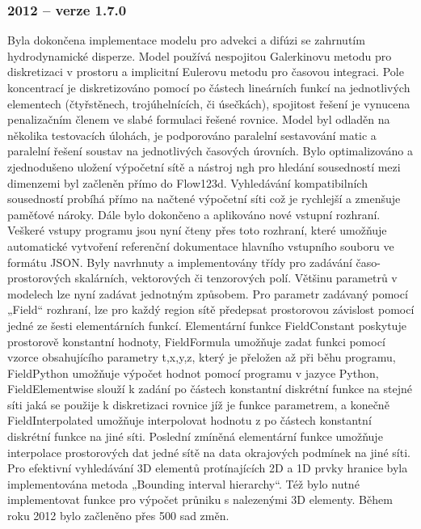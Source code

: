 \documentclass[11pt]{report}
\begin{document}
\subsubsection{2012 -- verze 1.7.0}
Byla dokončena implementace modelu pro advekci a difúzi se zahrnutím 
hydrodynamické disperze. Model používá nespojitou Galerkinovu metodu pro 
diskretizaci v prostoru a implicitní Eulerovu metodu pro časovou integraci.  
Pole koncentrací je diskretizováno pomocí po částech lineárních funkcí na 
jednotlivých elementech (čtyřstěnech, trojúhelnících, či úsečkách), spojitost 
řešení je vynucena penalizačním členem ve slabé formulaci řešené rovnice. Model 
byl odladěn na několika testovacích úlohách, je podporováno paralelní 
sestavování matic a paralelní řešení soustav na jednotlivých časových 
úrovních.
Bylo optimalizováno a zjednodušeno uložení výpočetní sítě a nástroj ngh pro 
hledání sousedností mezi dimenzemi byl začleněn přímo do Flow123d. Vyhledávání 
kompatibilních sousedností probíhá přímo na načtené výpočetní síti což je 
rychlejší a zmenšuje paměťové nároky. 
Dále bylo dokončeno a aplikováno nové vstupní rozhraní. Veškeré vstupy programu 
jsou nyní čteny přes toto rozhraní, které umožňuje automatické vytvoření 
referenční dokumentace hlavního vstupního souboru ve formátu JSON.
Byly navrhnuty a implementovány třídy pro zadávání časo-prostorových skalárních, 
vektorových či tenzorových polí. Většinu parametrů v modelech lze nyní zadávat 
jednotným způsobem. Pro parametr zadávaný pomocí „Field“ rozhraní, lze pro každý 
region sítě předepsat prostorovou závislost pomocí jedné ze šesti 
elementárních funkcí. Elementární funkce FieldConstant poskytuje prostorově 
konstantní hodnoty, FieldFormula umožňuje zadat funkci pomocí vzorce 
obsahujícího parametry t,x,y,z, který je přeložen až při běhu programu, 
FieldPython umožňuje výpočet hodnot pomocí programu v jazyce Python, 
FieldElementwise slouží k zadání po částech konstantní diskrétní funkce na 
stejné síti jaká se použije k diskretizaci rovnice jíž je funkce parametrem, a 
konečně FieldInterpolated umožňuje interpolovat hodnotu z po částech konstantní 
diskrétní funkce na jiné síti. 
Poslední zmíněná elementární funkce umožňuje interpolace prostorových dat jedné 
sítě na data okrajových podmínek na jiné síti. Pro efektivní vyhledávání 3D 
elementů protínajících 2D a 1D prvky hranice byla implementována metoda  
„Bounding interval hierarchy“. Též bylo nutné implementovat funkce pro výpočet 
průniku s nalezenými 3D elementy.
 Během roku 2012 bylo začleněno přes 500 sad změn. 
\end{document}
